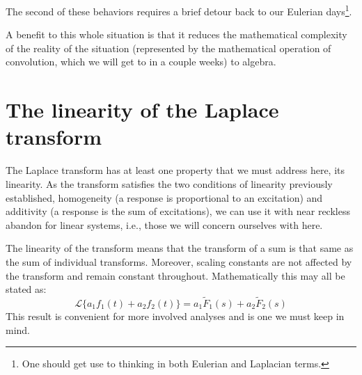 \documentclass[11pt]{book}
\begin{document}
The second of these behaviors requires a brief detour back to our Eulerian days\footnote{One should get use to thinking in both Eulerian and Laplacian terms.}.

A benefit to this whole situation is that it reduces the mathematical complexity of the reality of the situation (represented by the mathematical operation of convolution, which we will get to in a couple weeks) to algebra. 


\section{The linearity of the Laplace transform}
The Laplace transform has at least one property that we must address here, its linearity. As the transform satisfies the two conditions of linearity previously established, homogeneity (a response is proportional to an excitation) and additivity (a response is the sum of excitations), we can use it with near reckless abandon for linear systems, i.e., those we will concern ourselves with here.

The linearity of the transform means that the transform of a sum is that same as the sum of individual transforms. Moreover, scaling constants are not affected by the transform and remain constant throughout. Mathematically this may all be stated as:
\begin{equation}
	\mathcal{L}\{a_1f_1(t) + a_2f_2(t)\} = a_1\tilde{F}_1(s) + a_2\tilde{F}_2(s)
\end{equation}
This result is convenient for more involved analyses and is one we must keep in mind.
\end{document}

